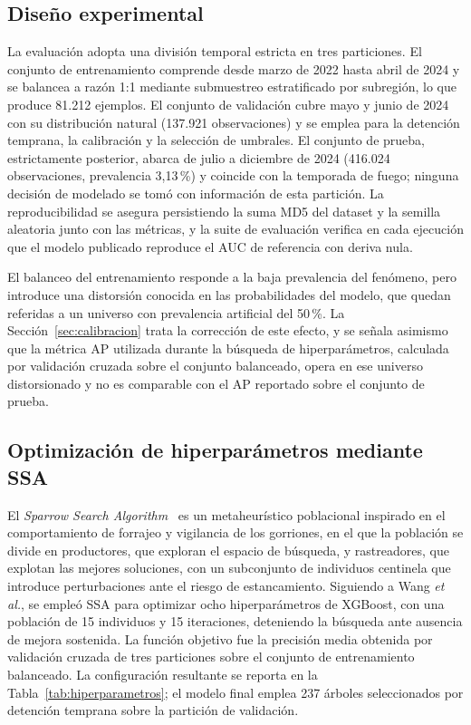 \documentclass[11pt,a4paper]{article}
\begin{document}
\subsection{Diseño experimental}
\label{sec:split}

La evaluación adopta una división temporal estricta en tres particiones. El
conjunto de entrenamiento comprende desde marzo de 2022 hasta abril de 2024
y se balancea a razón 1:1 mediante submuestreo estratificado por subregión,
lo que produce 81.212 ejemplos. El conjunto de validación cubre mayo y
junio de 2024 con su distribución natural (137.921 observaciones) y se
emplea para la detención temprana, la calibración y la selección de
umbrales. El conjunto de prueba, estrictamente posterior, abarca de julio a
diciembre de 2024 (416.024 observaciones, prevalencia 3,13\,\%) y coincide
con la temporada de fuego; ninguna decisión de modelado se tomó con
información de esta partición. La reproducibilidad se asegura persistiendo
la suma MD5 del dataset y la semilla aleatoria junto con las métricas, y la
suite de evaluación verifica en cada ejecución que el modelo publicado
reproduce el AUC de referencia con deriva nula.

El balanceo del entrenamiento responde a la baja prevalencia del fenómeno,
pero introduce una distorsión conocida en las probabilidades del modelo,
que quedan referidas a un universo con prevalencia artificial del 50\,\%.
La Sección~\ref{sec:calibracion} trata la corrección de este efecto, y se
señala asimismo que la métrica AP utilizada durante la búsqueda de
hiperparámetros, calculada por validación cruzada sobre el conjunto
balanceado, opera en ese universo distorsionado y no es comparable con el
AP reportado sobre el conjunto de prueba.

\subsection{Optimización de hiperparámetros mediante SSA}
\label{sec:ssa}

El \emph{Sparrow Search Algorithm}~\cite{xue2020} es un metaheurístico
poblacional inspirado en el comportamiento de forrajeo y vigilancia de los
gorriones, en el que la población se divide en productores, que exploran el
espacio de búsqueda, y rastreadores, que explotan las mejores soluciones,
con un subconjunto de individuos centinela que introduce perturbaciones
ante el riesgo de estancamiento. Siguiendo a Wang \emph{et al.}, se empleó
SSA para optimizar ocho hiperparámetros de XGBoost, con una población de 15
individuos y 15 iteraciones, deteniendo la búsqueda ante ausencia de mejora
sostenida. La función objetivo fue la precisión media obtenida por
validación cruzada de tres particiones sobre el conjunto de entrenamiento
balanceado. La configuración resultante se reporta en la
Tabla~\ref{tab:hiperparametros}; el modelo final emplea 237 árboles
seleccionados por detención temprana sobre la partición de validación.
\end{document}
